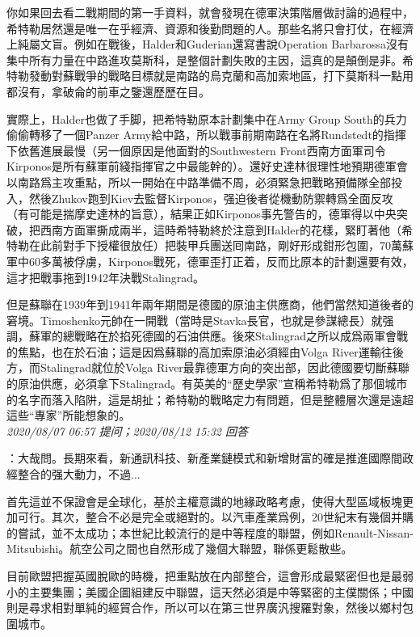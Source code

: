\documentclass[twocolumn]{ctexart}
\begin{document}
你如果回去看二戰期間的第一手資料，就會發現在德軍決策階層做討論的過程中，希特勒居然還是唯一在乎經濟、資源和後勤問題的人。那些名將只會打仗，在經濟上純屬文盲。例如在戰後，Halder和Guderian還寫書說Operation Barbarossa沒有集中所有力量在中路進攻莫斯科，是整個計劃失敗的主因，這真的是顛倒是非。希特勒發動對蘇戰爭的戰略目標就是南路的烏克蘭和高加索地區，打下莫斯科一點用都沒有，拿破侖的前車之鑒還歷歷在目。

實際上，Halder也做了手脚，把希特勒原本計劃集中在Army Group South的兵力偷偷轉移了一個Panzer Army給中路，所以戰事前期南路在名將Rundstedt的指揮下依舊進展最慢（另一個原因是他面對的Southwestern Front西南方面軍司令Kirponos是所有蘇軍前綫指揮官之中最能幹的）。還好史達林很理性地預期德軍會以南路爲主攻重點，所以一開始在中路準備不周，必須緊急把戰略預備隊全部投入，然後Zhukov跑到Kiev去監督Kirponos，强迫後者從機動防禦轉爲全面反攻（有可能是揣摩史達林的旨意），結果正如Kirponos事先警告的，德軍得以中央突破，把西南方面軍撕成兩半，這時希特勒終於注意到Halder的花樣，緊盯著他（希特勒在此前對手下授權很放任）把裝甲兵團送囘南路，剛好形成鉗形包圍，70萬蘇軍中60多萬被俘虜，Kirponos戰死，德軍歪打正着，反而比原本的計劃還要有效，這才把戰事拖到1942年決戰Stalingrad。

但是蘇聯在1939年到1941年兩年期間是德國的原油主供應商，他們當然知道後者的窘境。Timoshenko元帥在一開戰（當時是Stavka長官，也就是參謀總長）就强調，蘇軍的總戰略在於掐死德國的石油供應。後來Stalingrad之所以成爲兩軍會戰的焦點，也在於石油；這是因爲蘇聯的高加索原油必須經由Volga River運輸往後方，而Stalingrad就位於Volga River最靠德軍方向的突出部，因此德國要切斷蘇聯的原油供應，必須拿下Stalingrad。有英美的“歷史學家”宣稱希特勒爲了那個城市的名字而落入陷阱，這是胡扯；希特勒的戰略定力有問題，但是整體層次還是遠超這些“專家”所能想象的。
\\

\textit{\hfill\noindent\small 2020/08/07 06:57 提问；2020/08/12 15:32 回答}

：大哉問。長期來看，新通訊科技、新產業鏈模式和新增財富的確是推進國際間政經整合的强大動力，不過...

首先這並不保證會是全球化，基於主權意識的地緣政略考慮，使得大型區域板塊更加可行。其次，整合不必是完全或絕對的。以汽車產業爲例，20世紀末有幾個并購的嘗試，並不太成功；本世紀比較流行的是中等程度的聯盟，例如Renault-Nissan-Mitsubishi。航空公司之間也自然形成了幾個大聯盟，聯係更鬆散些。

目前歐盟把握英國脫歐的時機，把重點放在内部整合，這會形成最緊密但也是最弱小的主要集團；美國企圖組建反中聯盟，這天然必須是中等緊密的主僕關係；中國則是尋求相對單純的經貿合作，所以可以在第三世界廣汎搜羅對象，然後以鄉村包圍城市。
\end{document}
